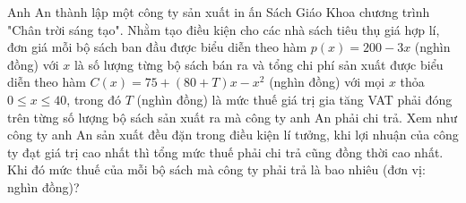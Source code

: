 \begin{ex}%
Anh An thành lập một công ty sản xuất in ấn Sách Giáo Khoa chương trình "Chân trời sáng tạo". Nhằm tạo điều kiện cho các nhà sách tiêu thụ giá hợp lí, đơn giá mỗi bộ sách ban đầu được biểu diễn theo hàm $ p(x)=200-3x$ (nghìn đồng) với $ x$ là số lượng từng bộ sách bán ra và tổng chi phí sản xuất được biểu diễn theo hàm $ C(x)=75+\left(80+T\right)x-x^2$ (nghìn đồng) với mọi $ x$ thỏa $ 0\le x\le 40$, trong đó $ T$ (nghìn đồng) là mức thuế giá trị gia tăng VAT phải đóng trên từng số lượng bộ sách sản xuất ra mà công ty anh An phải chi trả. Xem như công ty anh An sản xuất đều đặn trong điều kiện lí tưởng, khi lợi nhuận của công ty đạt giá trị cao nhất thì tổng mức thuế phải chi trả cũng đồng thời cao nhất. Khi đó mức thuế của mỗi bộ sách mà công ty phải trả là bao nhiêu (đơn vị: nghìn đồng)?
\end{ex}

